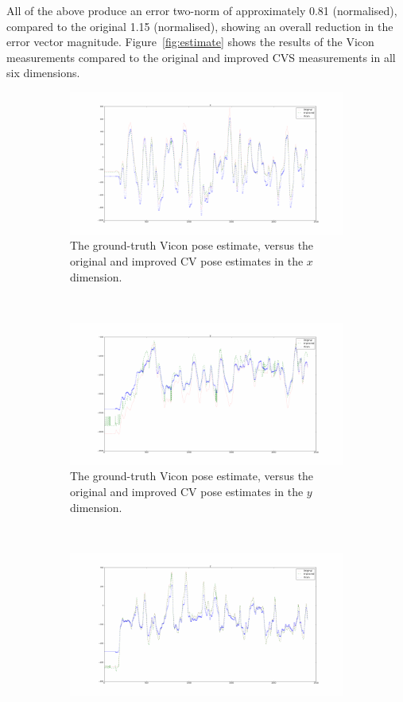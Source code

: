 All of the above produce an error two-norm of approximately 0.81 (normalised), compared to the original 1.15 (normalised), showing an overall reduction in the error vector magnitude. Figure~\ref{fig:estimate} shows the results of the Vicon measurements compared to the original and improved CVS measurements in all six dimensions.

\begin{figure}
  \begin{subfigure}{0.45\textwidth}
    \includegraphics[width=\textwidth]{figures/chapter3/x}
    \caption{The ground-truth Vicon pose estimate, versus the original and improved CV pose estimates in the $x$ dimension.}
  \label{fig:estimate-x}
  \end{subfigure}
~
  \begin{subfigure}{0.45\textwidth}
    \includegraphics[width=\textwidth]{figures/chapter3/y}
    \caption{The ground-truth Vicon pose estimate, versus the original and improved CV pose estimates in the $y$ dimension.}
  \label{fig:estimate-y}
  \end{subfigure}
~
  \begin{subfigure}{0.45\textwidth}
    \includegraphics[width=\textwidth]{figures/chapter3/z}

\end{subfigure}
\end{figure}
